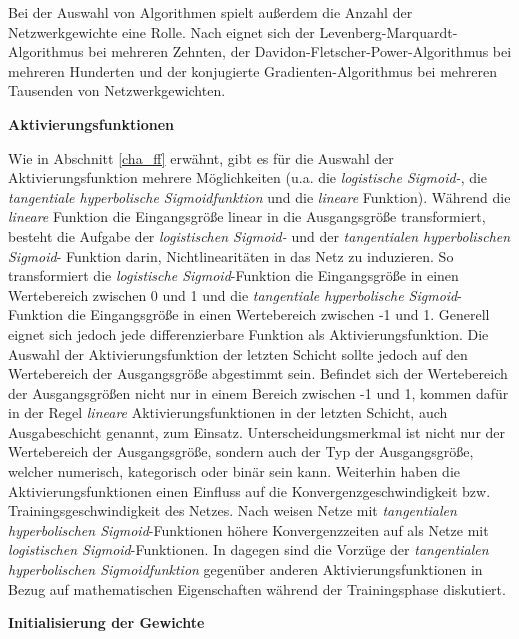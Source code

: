 Bei der Auswahl von Algorithmen spielt außerdem  die Anzahl der Netzwerkgewichte eine Rolle. Nach \cite{WarrenS.Sarle.1994} eignet sich der Levenberg-Marquardt-Algorithmus bei mehreren Zehnten, der Davidon-Fletscher-Power-Algorithmus bei mehreren Hunderten und der konjugierte Gradienten-Algorithmus bei mehreren Tausenden von Netzwerkgewichten. 


\textbf{Aktivierungsfunktionen} 

Wie in Abschnitt \ref{cha_ff} erwähnt, gibt es für die Auswahl der Aktivierungsfunktion mehrere Möglichkeiten (u.a. die \textit{logistische Sigmoid-}, die \textit{tangentiale hyperbolische Sigmoidfunktion} und die \textit{lineare} Funktion). Während die \textit{lineare} Funktion die Eingangsgröße linear in die Ausgangsgröße transformiert, besteht die Aufgabe der \textit{logistischen Sigmoid-} und der \textit{tangentialen hyperbolischen Sigmoid}- Funktion darin, Nichtlinearitäten in das Netz zu induzieren. So transformiert die \textit{logistische Sigmoid}-Funktion die Eingangsgröße in einen Wertebereich zwischen 0 und 1 und die \textit{tangentiale hyperbolische Sigmoid}-Funktion die Eingangsgröße in einen Wertebereich zwischen -1 und 1. Generell eignet sich jedoch jede differenzierbare Funktion als Aktivierungsfunktion. Die Auswahl der Aktivierungsfunktion der letzten Schicht sollte jedoch auf den Wertebereich der Ausgangsgröße abgestimmt sein. Befindet sich der Wertebereich der Ausgangsgrößen nicht nur in einem Bereich zwischen -1 und 1, kommen dafür in der Regel \textit{lineare} Aktivierungsfunktionen in der letzten Schicht, auch Ausgabeschicht genannt, zum Einsatz. Unterscheidungsmerkmal ist nicht nur der Wertebereich der Ausgangsgröße, sondern auch der Typ der Ausgangsgröße, welcher numerisch, kategorisch oder binär sein kann.  Weiterhin haben die Aktivierungsfunktionen einen Einfluss auf die Konvergenzgeschwindigkeit bzw. Trainingsgeschwindigkeit des Netzes. Nach \cite{Bishop.2010} weisen Netze mit \textit{tangentialen hyperbolischen Sigmoid}-Funktionen höhere Konvergenzzeiten auf als Netze mit \textit{logistischen Sigmoid}-Funktionen. In \cite{Kalman.June1992} dagegen sind die Vorzüge der \textit{tangentialen hyperbolischen Sigmoidfunktion} gegenüber anderen Aktivierungsfunktionen in Bezug auf mathematischen Eigenschaften während der Trainingsphase diskutiert.

\textbf{Initialisierung der Gewichte}


